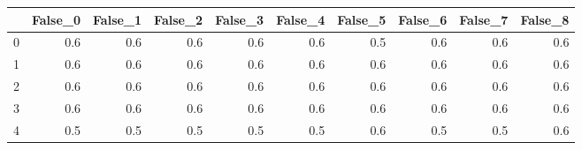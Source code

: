 \begin{tabular}{lrrrrrrrrr}
\toprule
{} &  False\_0 &  False\_1 &  False\_2 &  False\_3 &  False\_4 &  False\_5 &  False\_6 &  False\_7 &  False\_8 \\ \hline
\midrule
0 &      0.6 &      0.6 &      0.6 &      0.6 &      0.6 &      0.5 &      0.6 &      0.6 &      0.6 \\ \hline
1 &      0.6 &      0.6 &      0.6 &      0.6 &      0.6 &      0.6 &      0.6 &      0.6 &      0.6 \\ \hline
2 &      0.6 &      0.6 &      0.6 &      0.6 &      0.6 &      0.6 &      0.6 &      0.6 &      0.6 \\ \hline
3 &      0.6 &      0.6 &      0.6 &      0.6 &      0.6 &      0.6 &      0.6 &      0.6 &      0.6 \\ \hline
4 &      0.5 &      0.5 &      0.5 &      0.5 &      0.5 &      0.6 &      0.5 &      0.5 &      0.6 \\ \hline
\bottomrule
\end{tabular}
